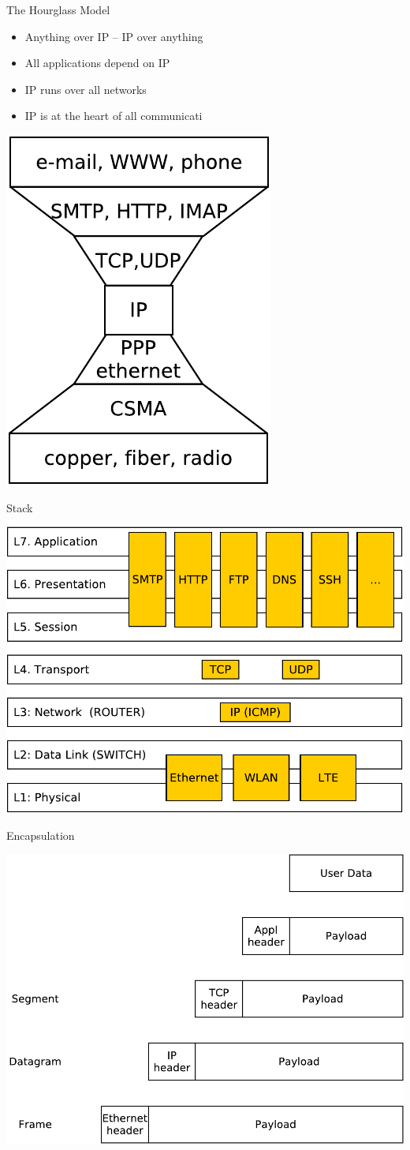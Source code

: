 \documentclass{beamer}
\begin{document}
\begin{frame}{The Hourglass Model}
  \begin{itemize}
    \item Anything over IP – IP over anything
    \item All applications depend on IP
    \item IP runs over all networks
    \item IP is at the heart of all communicati
  \end{itemize}
  \begin{center}
    \includegraphics[width=0.4\linewidth]{net2}
  \end{center}
\end{frame}

\begin{frame}{Stack}
  \begin{center}
    \includegraphics[width=0.4\linewidth]{stack}
  \end{center}
\end{frame}

\begin{frame}{Encapsulation}
  \begin{center}
    \includegraphics[width=0.7\linewidth]{encapsulation}
  \end{center}
\end{frame}
\end{document}

